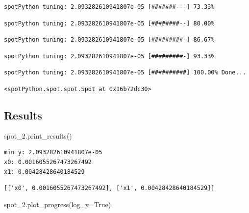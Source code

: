 \documentclass[
  letterpaper,
  DIV=11,
  numbers=noendperiod]{scrreprt}
\newenvironment{Shaded}{\begin{snugshade}}{\end{snugshade}}
\newcommand{\NormalTok}[1]{\textcolor[rgb]{0.00,0.23,0.31}{#1}}
\newcommand{\OperatorTok}[1]{\textcolor[rgb]{0.37,0.37,0.37}{#1}}
\newcommand{\VariableTok}[1]{\textcolor[rgb]{0.07,0.07,0.07}{#1}}
\begin{document}
\begin{verbatim}
spotPython tuning: 2.093282610941807e-05 [#######---] 73.33% 
\end{verbatim}

\begin{verbatim}
spotPython tuning: 2.093282610941807e-05 [########--] 80.00% 
\end{verbatim}

\begin{verbatim}
spotPython tuning: 2.093282610941807e-05 [#########-] 86.67% 
\end{verbatim}

\begin{verbatim}
spotPython tuning: 2.093282610941807e-05 [#########-] 93.33% 
\end{verbatim}

\begin{verbatim}
spotPython tuning: 2.093282610941807e-05 [##########] 100.00% Done...
\end{verbatim}

\begin{verbatim}
<spotPython.spot.spot.Spot at 0x16b72dc30>
\end{verbatim}

\hypertarget{results-1}{%
\subsection{Results}\label{results-1}}

\begin{Shaded}
\begin{Highlighting}[]
\NormalTok{spot\_2.print\_results()}
\end{Highlighting}
\end{Shaded}

\begin{verbatim}
min y: 2.093282610941807e-05
x0: 0.0016055267473267492
x1: 0.00428428640184529
\end{verbatim}

\begin{verbatim}
[['x0', 0.0016055267473267492], ['x1', 0.00428428640184529]]
\end{verbatim}

\begin{Shaded}
\begin{Highlighting}[]
\NormalTok{spot\_2.plot\_progress(log\_y}\OperatorTok{=}\VariableTok{True}\NormalTok{)}
\end{Highlighting}
\end{Shaded}
\end{document}

